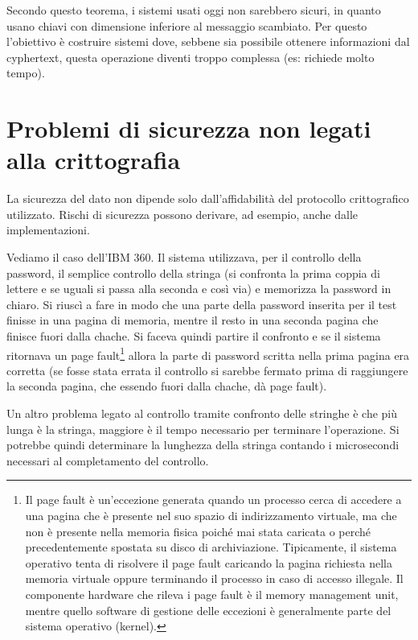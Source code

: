 Secondo questo teorema, i sistemi usati oggi non sarebbero sicuri, in quanto usano chiavi con dimensione inferiore al messaggio scambiato. Per questo l'obiettivo è costruire sistemi dove, sebbene sia possibile ottenere informazioni dal cyphertext, questa operazione diventi troppo complessa (es: richiede molto tempo).
	
\section{Problemi di sicurezza non legati alla crittografia}
La sicurezza del dato non dipende solo dall'affidabilità del protocollo crittografico utilizzato. Rischi di sicurezza possono derivare, ad esempio, anche dalle implementazioni. 

Vediamo il caso dell'IBM 360. Il sistema utilizzava, per il controllo della password, il semplice controllo della stringa (si confronta la prima coppia di lettere e se uguali si passa alla seconda e così via) e memorizza la password in chiaro. Si riuscì a fare in modo che una parte della password inserita per il test finisse in una pagina di memoria, mentre il resto in una seconda pagina che finisce fuori dalla chache. Si faceva quindi partire il confronto e se il sistema ritornava un page fault\footnote{Il page fault è un'eccezione generata quando un processo cerca di accedere a una pagina che è presente nel suo spazio di indirizzamento virtuale, ma che non è presente nella memoria fisica poiché mai stata caricata o perché precedentemente spostata su disco di archiviazione. Tipicamente, il sistema operativo tenta di risolvere il page fault caricando la pagina richiesta nella memoria virtuale oppure terminando il processo in caso di accesso illegale. Il componente hardware che rileva i page fault è il memory management unit, mentre quello software di gestione delle eccezioni è generalmente parte del sistema operativo (kernel). } allora la parte di password scritta nella prima pagina era corretta (se fosse stata errata il controllo si sarebbe fermato prima di raggiungere la seconda pagina, che essendo fuori dalla chache, dà page fault).

Un altro problema legato al controllo tramite confronto delle stringhe è che più lunga è la stringa, maggiore è il tempo necessario per terminare l'operazione. Si potrebbe quindi determinare la lunghezza della stringa contando i microsecondi necessari al completamento del controllo.